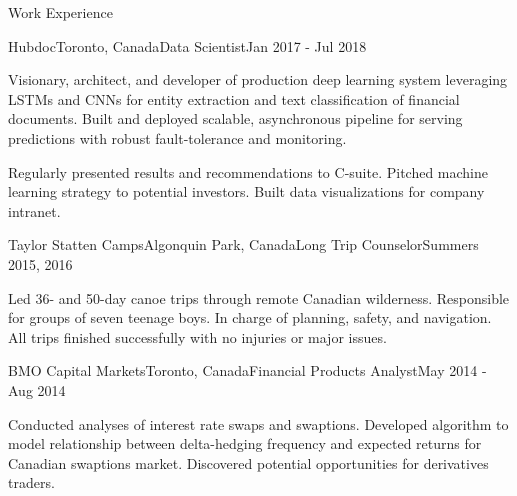 \documentclass{resume} %
\begin{document}
\begin{rSection}{Work Experience}
\begin{rSubsection}{Hubdoc}{Toronto, Canada}{Data Scientist}{Jan 2017 - Jul 2018}
\item
    Visionary, architect, and developer of production deep learning system leveraging LSTMs and CNNs
    for entity extraction and text classification of financial documents.
    Built and deployed scalable, asynchronous pipeline for serving predictions with robust fault-tolerance and monitoring.

\item
    Regularly presented results and recommendations to C-suite.
    Pitched machine learning strategy to potential investors.
    Built data visualizations for company intranet.

\end{rSubsection}


\begin{rSubsection}{Taylor Statten Camps}{Algonquin Park, Canada}{Long Trip Counselor}{Summers 2015, 2016}

\item
    Led 36- and 50-day canoe trips through remote Canadian wilderness. Responsible for groups of seven teenage boys. In charge of planning,
    safety, and navigation. All trips finished successfully with no injuries or major issues.

\end{rSubsection}


\begin{rSubsection}{BMO Capital Markets}{Toronto, Canada}{Financial Products Analyst}{May 2014 - Aug 2014}

\item
    Conducted analyses of interest rate swaps and swaptions.
    Developed algorithm to model relationship between delta-hedging frequency and expected returns for Canadian swaptions market.
    Discovered potential opportunities for derivatives traders.

\end{rSubsection}


\end{rSection}

\end{document}

